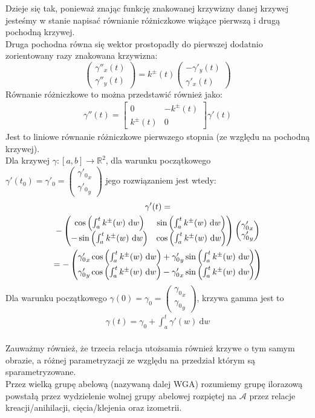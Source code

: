 \documentclass[a4paper, 12pt, twosided]{article}
\newcommand{\todo}[1]{\hfill \break \textbf{\Huge \textcolor{violet}{TO DO: #1} \hfill \break}
\normalsize}
\newcommand{\smalltodoII}[1]{\hfill \break \textbf{\ \textcolor{violet}{To do: #1}}\hfill \break}
\newcommand{\colvect}[2]{\begin{pmatrix}#1 \\ #2\end{pmatrix}}
\begin{document}
Dzieje się tak, ponieważ znając funkcję znakowanej krzywizny danej krzywej jesteśmy w stanie 
napisać równianie różniczkowe wiążące pierwszą i drugą pochodną krzywej. \\
\indent Druga pochodna równa się wektor prostopadły do pierwszej dodatnio zorientowany razy 
 znakowana 
krzywizna: \\
\begin{equation}
    \colvect{\gamma''_x(t)}{\gamma''_y(t)} = k^\pm(t)\colvect{-\gamma'_y(t)}{\gamma'_x(t)}
\end{equation}
Równanie różniczkowe to można przedstawić również jako:
\begin{gather}
\gamma''(t) = \begin{bmatrix}
0 & -k^\pm(t) \\
k^\pm(t) & 0
\end{bmatrix}\gamma'(t)
\end{gather}
Jest to liniowe równanie różniczkowe pierwszego stopnia (ze względu na pochodną krzywej). \\
Dla krzywej $\gamma : [a, b] \to \mathbb{R}^2$, dla warunku początkowego $\gamma'(t_0)=\gamma'_0 = 
\colvect{{\gamma'_0}_x}{{\gamma'_0}_y}$ jego rozwiązaniem jest wtedy:
\begin{gather}
\gamma'(t) = \notag \\ 
-\begin{pmatrix}\cos\left(\int_a^t k^\pm(w)\  \text{d}w\right) & 
\sin\left(\int_a^t k^\pm(w)\  \text{d}w\right) \\
-\sin\left(\int_a^t k^\pm(w)\  \text{d}w\right) & \cos\left(\int_a^t k^\pm(w)\  \text{d} w\right)
\end{pmatrix} \colvect{{\gamma'_0}_x}{{\gamma'_0}_y} \\
 = -\colvect{{\gamma'_0}_x \cos\left(\int_a^t k^\pm(w)\  \text{d}w\right) + {\gamma'_0}_y 
\sin\left(\int_a^t k^\pm(w)\  \text{d}w\right)}{{\gamma'_0}_y \cos\left(\int_a^t k^\pm(w)\  \text{d}
w\right) - {\gamma'_0}_x \sin\left(\int_a^t k^\pm(w)\  \text{d}w\right)} \notag
\end{gather}
Dla warunku początkowego $\gamma(0) = \gamma_0 = \colvect{{\gamma_0}_x}{{\gamma_0}_y}$, krzywa 
 gamma 
jest to
\begin{gather}
\gamma(t) = \gamma_0 + \int_a^t \gamma'(w) \  \text{d}w
\end{gather}
\\[16pt]
\indent Zauważmy również, że trzecia relacja utożsamia również krzywe o tym samym obrazie, a różnej 
 parametryzacji ze
względu na przedział którym są sparametryzowane. \\
\indent Przez wielką grupę abelową (nazywaną dalej WGA) rozumiemy grupę ilorazową powstałą przez 
wydzielenie wolnej grupy abelowej rozpiętej na $\mathcal{A}$ przez relacje kreacji/anihilacji, 
cięcia/klejenia oraz izometrii.
\end{document}
